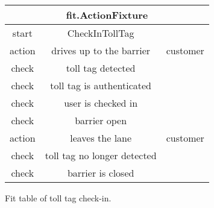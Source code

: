 \begin{figure}[H]
\begin{centering}
\begin{tabular}{|c|c|c|}
\hline 
\multicolumn{3}{|c|}{fit.ActionFixture}\tabularnewline
\hline 
start & CheckInTollTag & \tabularnewline
\hline 
action & drives up to the barrier & customer\tabularnewline
\hline 
check & toll tag detected & \tabularnewline
\hline 
check & toll tag is authenticated & \tabularnewline
\hline 
check & user is checked in & \tabularnewline
\hline 
check & barrier open & \tabularnewline
\hline 
action & leaves the lane & customer\tabularnewline
\hline 
check & toll tag no longer detected & \tabularnewline
\hline 
check & barrier is closed & \tabularnewline
\hline 
\end{tabular}
\caption{Fit table of toll tag check-in.}
\end{centering}
\end{figure}

